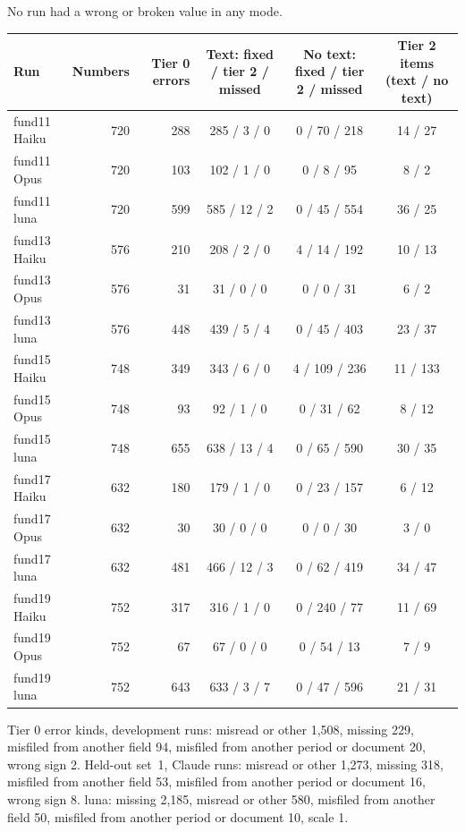  No run had a wrong or broken value in any mode.
\begin{center}
\begin{tabular}{lrrccc}
\toprule
Run & Numbers & Tier 0 errors & Text: fixed / tier 2 / missed & No text: fixed / tier 2 / missed & Tier 2 items (text / no text) \\
\midrule
fund11 Haiku & 720 & 288 & 285 / 3 / 0 & 0 / 70 / 218 & 14 / 27 \\
fund11 Opus & 720 & 103 & 102 / 1 / 0 & 0 / 8 / 95 & 8 / 2 \\
fund11 luna & 720 & 599 & 585 / 12 / 2 & 0 / 45 / 554 & 36 / 25 \\
fund13 Haiku & 576 & 210 & 208 / 2 / 0 & 4 / 14 / 192 & 10 / 13 \\
fund13 Opus & 576 & 31 & 31 / 0 / 0 & 0 / 0 / 31 & 6 / 2 \\
fund13 luna & 576 & 448 & 439 / 5 / 4 & 0 / 45 / 403 & 23 / 37 \\
fund15 Haiku & 748 & 349 & 343 / 6 / 0 & 4 / 109 / 236 & 11 / 133 \\
fund15 Opus & 748 & 93 & 92 / 1 / 0 & 0 / 31 / 62 & 8 / 12 \\
fund15 luna & 748 & 655 & 638 / 13 / 4 & 0 / 65 / 590 & 30 / 35 \\
fund17 Haiku & 632 & 180 & 179 / 1 / 0 & 0 / 23 / 157 & 6 / 12 \\
fund17 Opus & 632 & 30 & 30 / 0 / 0 & 0 / 0 / 30 & 3 / 0 \\
fund17 luna & 632 & 481 & 466 / 12 / 3 & 0 / 62 / 419 & 34 / 47 \\
fund19 Haiku & 752 & 317 & 316 / 1 / 0 & 0 / 240 / 77 & 11 / 69 \\
fund19 Opus & 752 & 67 & 67 / 0 / 0 & 0 / 54 / 13 & 7 / 9 \\
fund19 luna & 752 & 643 & 633 / 3 / 7 & 0 / 47 / 596 & 21 / 31 \\
\bottomrule
\end{tabular}
\end{center}

Tier 0 error kinds, development runs: misread or other 1,508, missing 229, misfiled from another field 94, misfiled from another period or document 20, wrong sign 2. Held-out set~1, Claude runs: misread or other 1,273, missing 318, misfiled from another field 53, misfiled from another period or document 16, wrong sign 8. luna: missing 2,185, misread or other 580, misfiled from another field 50, misfiled from another period or document 10, scale 1.

